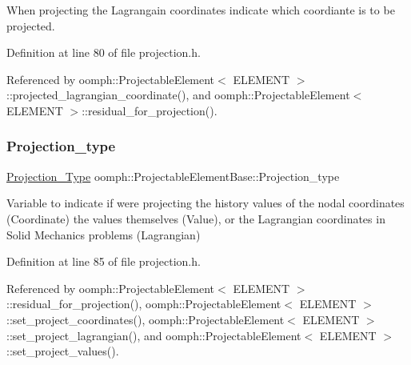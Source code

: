 When projecting the Lagrangain coordinates indicate which coordiante is to be projected. 



Definition at line 80 of file projection.\+h.



Referenced by oomph\+::\+Projectable\+Element$<$ E\+L\+E\+M\+E\+N\+T $>$\+::projected\+\_\+lagrangian\+\_\+coordinate(), and oomph\+::\+Projectable\+Element$<$ E\+L\+E\+M\+E\+N\+T $>$\+::residual\+\_\+for\+\_\+projection().

\mbox{\label{classoomph_1_1ProjectableElementBase_a1081b0f4b3633612639f92d13a187db5}} 
\subsubsection{\texorpdfstring{Projection\+\_\+type}{Projection\_type}}
{\footnotesize\ttfamily \hyperlink{classoomph_1_1ProjectableElementBase_aa6b28955725b5626cc4cbf0465f12a9e}{Projection\+\_\+\+Type} oomph\+::\+Projectable\+Element\+Base\+::\+Projection\+\_\+type\hspace{0.3cm}{\ttfamily [protected]}}



Variable to indicate if we\textquotesingle{}re projecting the history values of the nodal coordinates (Coordinate) the values themselves (Value), or the Lagrangian coordinates in Solid Mechanics problems (Lagrangian) 



Definition at line 85 of file projection.\+h.



Referenced by oomph\+::\+Projectable\+Element$<$ E\+L\+E\+M\+E\+N\+T $>$\+::residual\+\_\+for\+\_\+projection(), oomph\+::\+Projectable\+Element$<$ E\+L\+E\+M\+E\+N\+T $>$\+::set\+\_\+project\+\_\+coordinates(), oomph\+::\+Projectable\+Element$<$ E\+L\+E\+M\+E\+N\+T $>$\+::set\+\_\+project\+\_\+lagrangian(), and oomph\+::\+Projectable\+Element$<$ E\+L\+E\+M\+E\+N\+T $>$\+::set\+\_\+project\+\_\+values().

\mbox{\label{classoomph_1_1ProjectableElementBase_a4698e178e500468c0af8c37bd47d0bd3}} 
